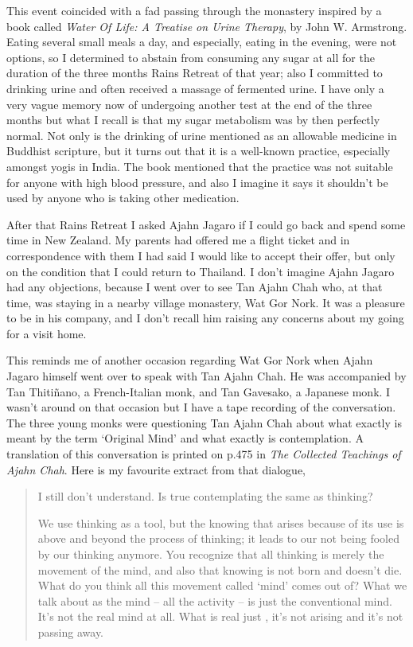 This event coincided with a fad passing through the monastery inspired
by a book called \emph{Water Of Life: A Treatise on Urine Therapy}, by
John W. Armstrong. Eating several small meals a day, and especially,
eating in the evening, were not options, so I determined to abstain from
consuming any sugar at all for the duration of the three months Rains
Retreat of that year; also I committed to drinking urine and often
received a massage of fermented urine. I have only a very vague memory
now of undergoing another test at the end of the three months but what I
recall is that my sugar metabolism was by then perfectly normal. Not
only is the drinking of urine mentioned as an allowable medicine in
Buddhist scripture, but it turns out that it is a well-known practice,
especially amongst yogis in India. The book mentioned that the practice
was not suitable for anyone with high blood pressure, and also I imagine
it says it shouldn't be used by anyone who is taking other medication.

After that Rains Retreat I asked Ajahn Jagaro if I could go back and
spend some time in New Zealand. My parents had offered me a flight ticket and in correspondence with them I had said I would like to accept their offer, but only on the condition that I could return to Thailand. I don't imagine Ajahn Jagaro had any objections, because I
went over to see Tan Ajahn Chah who, at that time, was staying in a
nearby village monastery, Wat Gor Nork. It was a pleasure to be in his
company, and I don't recall him raising any concerns about my going for
a visit home.

This reminds me of another occasion regarding Wat Gor Nork when Ajahn Jagaro himself went over to
speak with Tan Ajahn Chah. He was accompanied by Tan Thitiñano, a
French-Italian monk, and Tan Gavesako, a Japanese monk. I wasn't around
on that occasion but I have a tape recording of the conversation. The
three young monks were questioning Tan Ajahn Chah about what exactly is
meant by the term `Original Mind' and what exactly is contemplation. A
translation of this conversation is printed on p.475
in \emph{The Collected Teachings of Ajahn Chah}\cite{collected}.
Here is my favourite extract from that dialogue,

\begin{quotation}
 I still don't understand. Is true contemplating the same as thinking?

 We use thinking as a tool, but the knowing that arises
because of its use is above and beyond the process of thinking; it leads
to our not being fooled by our thinking anymore. You recognize that all
thinking is merely the movement of the mind, and also that knowing is
not born and doesn't die. What do you think all this movement called
`mind' comes out of? What we talk about as the mind -- all the activity
-- is just the conventional mind. It's not the real mind at all. What is
real just , it's not arising and it's not passing away.
\end{quotation}

